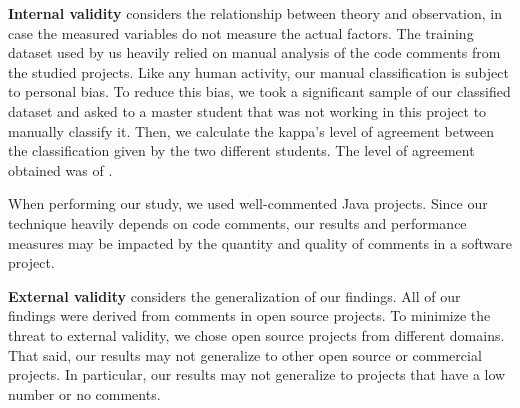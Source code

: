 \noindent\textbf{Internal validity} considers the relationship between theory and observation, in case the measured variables do not measure the actual factors. The training dataset used by us heavily relied on manual analysis of the code comments from the studied projects. Like any human activity, our manual classification is subject to personal bias. To reduce this bias, we took a significant sample of our classified dataset and asked to a master student that was not working in this project to manually classify it. Then, we calculate the kappa's level of agreement between the classification given by the two different students. The level of agreement obtained was of \todo{}.  

When performing our study, we used well-commented Java projects. Since our technique heavily depends on code comments, our results and performance measures may be impacted by the quantity and quality of comments in a software project.  

\noindent \textbf{External validity} considers the generalization of our findings. All of our findings were derived from comments in open source projects. To minimize the threat to external validity, we chose open source projects from different domains. That said, our results may not generalize to other open source or commercial projects. In particular, our results may not generalize to projects that have a low number or no comments.
